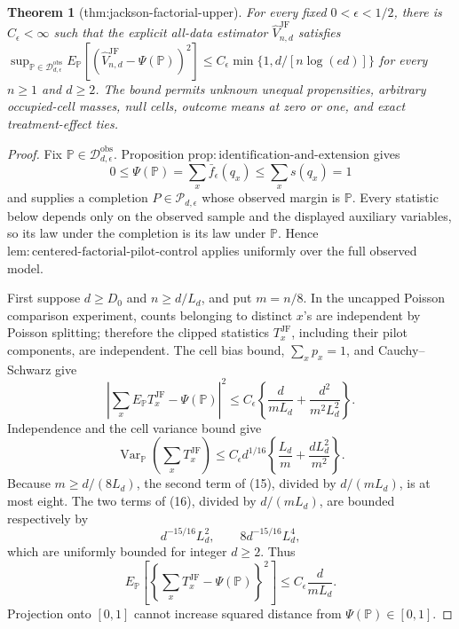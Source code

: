 \documentclass{article}
\newtheorem{theorem}{Theorem}
\begin{document}
\begin{theorem}[thm:jackson-factorial-upper]\label{thm:jackson-factorial-upper}
For every fixed \(0<\epsilon<1/2\), there is \(C_\epsilon<\infty\) such that the explicit all-data estimator \(\widehat V_{n,d}^{\mathrm{JF}}\) satisfies \(\sup_{\mathbb P\in\mathcal D_{d,\epsilon}^{\mathrm{obs}}}E_{\mathbb P}[(\widehat V_{n,d}^{\mathrm{JF}}-\Psi(\mathbb P))^2]\leq C_\epsilon\min\{1,d/[n\log(ed)]\}\) for every \(n\geq1\) and \(d\geq2\).  The bound permits unknown unequal propensities, arbitrary occupied-cell masses, null cells, outcome means at zero or one, and exact treatment-effect ties.
\end{theorem}
\begin{proof}
Fix \(\mathbb P\in\mathcal D_{d,\epsilon}^{\mathrm{obs}}\).  Proposition \(\mathrm{prop:identification\mbox{-}and\mbox{-}extension}\) gives
\[
 0\leq\Psi(\mathbb P)=\sum_x\bar f_\epsilon(q_x)
 \leq\sum_xs(q_x)=1
\]
and supplies a completion \(P\in\mathcal P_{d,\epsilon}\) whose observed margin is \(\mathbb P\).  Every statistic below depends only on the observed sample and the displayed auxiliary variables, so its law under the completion is its law under \(\mathbb P\).  Hence \(\mathrm{lem:centered\mbox{-}factorial\mbox{-}pilot\mbox{-}control}\) applies uniformly over the full observed model.

First suppose \(d\geq D_0\) and \(n\geq d/L_d\), and put \(m=n/8\).  In the uncapped Poisson comparison experiment, counts belonging to distinct \(x\)'s are independent by Poisson splitting; therefore the clipped statistics \(T_x^{\mathrm{JF}}\), including their pilot components, are independent.  The cell bias bound, \(\sum_xp_x=1\), and Cauchy--Schwarz give
\[
 \left|\sum_xE_{\mathbb P}T_x^{\mathrm{JF}}-\Psi(\mathbb P)\right|^2
 \leq C_\epsilon\left\{
 \frac d{mL_d}+\frac{d^2}{m^2L_d^2}\right\}.                     \tag{15}
\]
Independence and the cell variance bound give
\[
 \operatorname{Var}_{\mathbb P}\left(\sum_xT_x^{\mathrm{JF}}\right)
 \leq C_\epsilon d^{1/16}
 \left\{\frac{L_d}{m}+\frac{dL_d^2}{m^2}\right\}.               \tag{16}
\]
Because \(m\geq d/(8L_d)\), the second term of (15), divided by \(d/(mL_d)\), is at most eight.  The two terms of (16), divided by \(d/(mL_d)\), are bounded respectively by
\[
 d^{-15/16}L_d^2,
 \qquad 8d^{-15/16}L_d^4,
\]
which are uniformly bounded for integer \(d\geq2\).  Thus
\[
 E_{\mathbb P}\left[
 \left\{\sum_xT_x^{\mathrm{JF}}-\Psi(\mathbb P)\right\}^2\right]
 \leq C_\epsilon\frac d{mL_d}.                                    \tag{17}
\]
Projection onto \([0,1]\) cannot increase squared distance from \(\Psi(\mathbb P)\in[0,1]\).


\end{proof}
\end{document}
